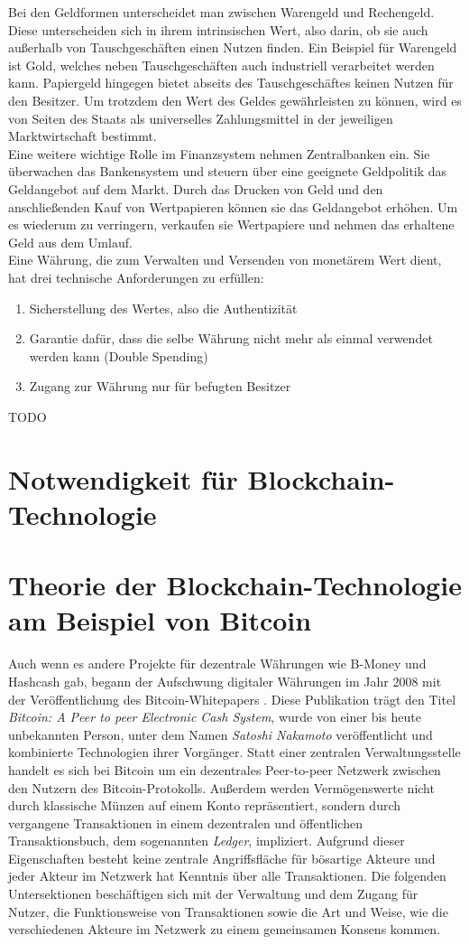 Bei den Geldformen unterscheidet man zwischen Warengeld und Rechengeld. Diese unterscheiden sich in ihrem intrinsischen Wert, also darin, ob sie auch außerhalb von Tauschgeschäften einen Nutzen finden. Ein Beispiel für Warengeld ist Gold, welches neben Tauschgeschäften auch industriell verarbeitet werden kann.
Papiergeld hingegen bietet abseits des Tauschgeschäftes keinen Nutzen für den Besitzer. Um trotzdem den Wert des Geldes gewährleisten zu können, wird es von Seiten des Staats als universelles Zahlungsmittel in der jeweiligen Marktwirtschaft bestimmt.\\

Eine weitere wichtige Rolle im Finanzsystem nehmen Zentralbanken ein. Sie überwachen das Bankensystem und steuern über eine geeignete Geldpolitik das Geldangebot auf dem Markt.
Durch das Drucken von Geld und den anschließenden Kauf von Wertpapieren können sie das Geldangebot erhöhen. Um es wiederum zu verringern, verkaufen sie Wertpapiere und nehmen das erhaltene Geld aus dem Umlauf.\\

Eine Währung, die zum Verwalten und Versenden von monetärem Wert dient, hat drei technische Anforderungen zu erfüllen:
\begin{enumerate}
	\item Sicherstellung des Wertes, also die Authentizität
	\item Garantie dafür, dass die selbe Währung nicht mehr als einmal verwendet werden kann (Double Spending)
	\item Zugang zur Währung nur für befugten Besitzer
\end{enumerate}
TODO
\section{Notwendigkeit für Blockchain-Technologie}
\section{Theorie der Blockchain-Technologie am Beispiel von Bitcoin}
Auch wenn es andere Projekte für dezentrale Währungen wie B-Money und Hashcash gab, begann der Aufschwung digitaler Währungen im Jahr 2008 mit der Veröffentlichung des Bitcoin-Whitepapers  \cite{nakamoto_whitepaper_2008}. Diese Publikation trägt den Titel \emph{Bitcoin: A Peer to peer Electronic Cash System}, wurde von einer bis heute unbekannten Person, unter dem Namen \emph{Satoshi Nakamoto} veröffentlicht und kombinierte Technologien ihrer Vorgänger. Statt einer zentralen Verwaltungsstelle handelt es sich bei Bitcoin um ein dezentrales Peer-to-peer Netzwerk zwischen den Nutzern des Bitcoin-Protokolls. Außerdem werden Vermögenswerte nicht durch klassische Münzen auf einem Konto repräsentiert, sondern durch vergangene Transaktionen in einem dezentralen und öffentlichen Transaktionsbuch, dem sogenannten \emph{Ledger}, impliziert. Aufgrund dieser Eigenschaften besteht keine zentrale Angriffsfläche für bösartige Akteure und jeder Akteur im Netzwerk hat Kenntnis über alle Transaktionen. Die folgenden Untersektionen beschäftigen sich mit der Verwaltung und dem Zugang für Nutzer, die Funktionsweise von Transaktionen sowie die Art und Weise, wie die verschiedenen Akteure im Netzwerk zu einem gemeinsamen Konsens kommen.
